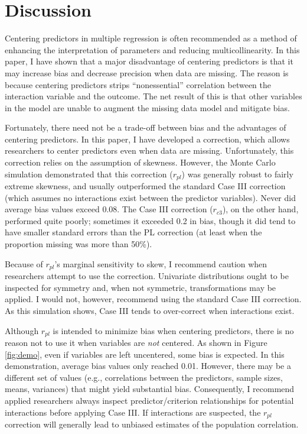 \documentclass[english,man]{apa6}
\theoremstyle{definition}
\theoremstyle{definition}
\theoremstyle{remark}
\begin{document}
\section{Discussion}\label{discussion}

Centering predictors in multiple regression is often recommended as a
method of enhancing the interpretation of parameters and reducing
multicollinearity. In this paper, I have shown that a major disadvantage
of centering predictors is that it may increase bias and decrease
precision when data are missing. The reason is because centering
predictors strips \enquote{nonessential} correlation between the
interaction variable and the outcome. The net result of this is that
other variables in the model are unable to augment the missing data
model and mitigate bias.

Fortunately, there need not be a trade-off between bias and the
advantages of centering predictors. In this paper, I have developed a
correction, which allows researchers to center predictors even when data
are missing. Unfortunately, this correction relies on the assumption of
skewness. However, the Monte Carlo simulation demonstrated that this
correction (\(r_{pl}\)) was generally robust to fairly extreme skewness,
and usually outperformed the standard Case III correction (which assumes
no interactions exist between the predictor variables). Never did
average bias values exceed 0.08. The Case III correction (\(r_{c3}\)),
on the other hand, performed quite poorly; sometimes it exceeded 0.2 in
bias, though it did tend to have smaller standard errors than the PL
correction (at least when the proportion missing was more than 50\%).

Because of \(r_{pl}\)'s marginal sensitivity to skew, I recommend
caution when researchers attempt to use the correction. Univariate
distributions ought to be inspected for symmetry and, when not
symmetric, transformations may be applied. I would not, however,
recommend using the standard Case III correction. As this simulation
shows, Case III tends to over-correct when interactions exist.

Although \(r_{pl}\) is intended to minimize bias when centering
predictors, there is no reason not to use it when variables are
\emph{not} centered. As shown in Figure \ref{fig:demo}, even if
variables are left uncentered, some bias is expected. In this
demonstration, average bias values only reached 0.01. However, there may
be a different set of values (e.g., correlations between the predictors,
sample sizes, means, variances) that might yield substantial bias.
Consequently, I recommend applied researchers always inspect
predictor/criterion relationships for potential interactions before
applying Case III. If interactions are suspected, the \(r_{pl}\)
correction will generally lead to unbiased estimates of the population
correlation.
\end{document}
